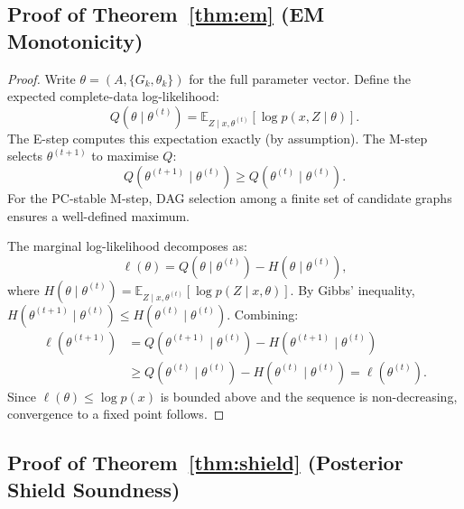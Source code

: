 \documentclass[11pt]{article}
\newcommand{\E}{\mathbb{E}}
\begin{document}
\subsection{Proof of Theorem~\ref{thm:em} (EM Monotonicity)}

\begin{proof}
Write $\theta = (A, \{G_k, \theta_k\})$ for the full parameter
vector.  Define the expected complete-data log-likelihood:
\begin{equation}
  Q(\theta \mid \theta^{(t)}) = \E_{Z \mid x,
  \theta^{(t)}}[\log p(x, Z \mid \theta)].
\end{equation}
The E-step computes this expectation exactly (by assumption).  The
M-step selects $\theta^{(t+1)}$ to maximise $Q$:
\begin{equation}
  Q(\theta^{(t+1)} \mid \theta^{(t)}) \geq
  Q(\theta^{(t)} \mid \theta^{(t)}).
\end{equation}
For the PC-stable M-step, DAG selection among a finite set of
candidate graphs ensures a well-defined maximum.

The marginal log-likelihood decomposes as:
\begin{equation}
  \ell(\theta) = Q(\theta \mid \theta^{(t)}) -
  H(\theta \mid \theta^{(t)}),
\end{equation}
where $H(\theta \mid \theta^{(t)}) =
\E_{Z \mid x, \theta^{(t)}}[\log p(Z \mid x, \theta)]$.
By Gibbs' inequality,
$H(\theta^{(t+1)} \mid \theta^{(t)}) \leq
H(\theta^{(t)} \mid \theta^{(t)})$.
Combining:
\begin{align}
  \ell(\theta^{(t+1)}) &= Q(\theta^{(t+1)} \mid \theta^{(t)})
    - H(\theta^{(t+1)} \mid \theta^{(t)}) \\
  &\geq Q(\theta^{(t)} \mid \theta^{(t)})
    - H(\theta^{(t)} \mid \theta^{(t)})
  = \ell(\theta^{(t)}).
\end{align}
Since $\ell(\theta) \leq \log p(x)$ is bounded above and the sequence
is non-decreasing, convergence to a fixed point follows.
\end{proof}

\subsection{Proof of Theorem~\ref{thm:shield}
  (Posterior Shield Soundness)}
\end{document}
